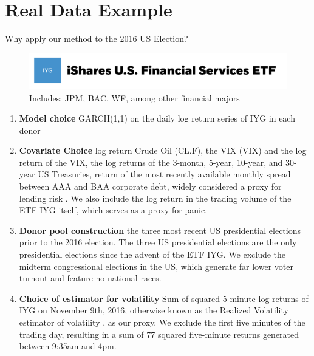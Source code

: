 \documentclass[9pt]{beamer}
\theoremstyle{definition}
\begin{document}
\section{Real Data Example}

\begin{frame}{Why apply our method to the 2016 US Election?}
    
\end{frame}
\begin{frame}
    \begin{figure}[H]
        \begin{center}
          \includegraphics[scale=.2]{iyg.png}
          \caption{Includes: JPM, BAC, WF, among other financial majors}
          \end{center}
        \end{figure}
\begin{enumerate}
    \item \textbf{Model choice} GARCH(1,1) on the daily log return series of IYG in each donor

    \item \textbf{Covariate Choice} log return Crude Oil (CL.F), the VIX (VIX) and the log return of the VIX, the log returns of the 3-month, 5-year, 10-year, and 30-year US Treasuries, return of the most recently available monthly spread between AAA and BAA corporate debt, widely considered a proxy for lending risk \parencite[][]{goodell2013us, kane1996p}.  We also include the log return in the trading volume of the ETF IYG itself, which serves as a proxy for panic.

    \item \textbf{Donor pool construction} the three most recent US presidential elections prior to the 2016 election.  The three US presidential elections are the only presidential elections since the advent of the ETF IYG.  We exclude the midterm congressional elections in the US, which generate far lower voter turnout and feature no national races.

    \item \textbf{Choice of estimator for volatility} Sum of squared 5-minute log returns of IYG on November 9th, 2016, otherwise known as the Realized Volatility estimator of volatility \parencite[][]{andersen2009realized}, as our proxy.  We exclude the first five minutes of the trading day, resulting in a sum of 77 squared five-minute returns generated between 9:35am and 4pm.
\end{enumerate} 

\end{frame}
\end{document}
